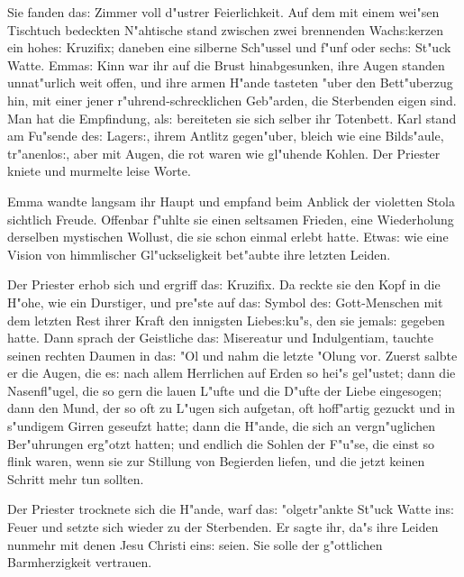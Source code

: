 \documentclass[oneside,12pt]{book}
\newenvironment{antiqua}{\normalfont}{}%
\newcommand{\s}{s:}%
\begin{document}
Sie fanden da{\s} Zimmer voll d"ustrer Feierlichkeit. Auf dem mit
einem wei"sen Tischtuch bedeckten N"ahtische stand zwischen zwei
brennenden Wach{\s}kerzen ein hohe{\s} Kruzifix; daneben eine
silberne Sch"ussel und f"unf oder sech{\s} St"uck Watte. Emma{\s}
Kinn war ihr auf die Brust hinabgesunken, ihre Augen standen
unnat"urlich weit offen, und ihre armen H"ande tasteten "uber den
Bett"uberzug hin, mit einer jener r"uhrend-schrecklichen
Geb"arden, die Sterbenden eigen sind. Man hat die Empfindung,
al{\s} bereiteten sie sich selber ihr Totenbett. Karl stand am
Fu"sende de{\s} Lager{\s}, ihrem Antlitz gegen"uber, bleich wie
eine Bilds"aule, tr"anenlo{\s}, aber mit Augen, die rot waren wie
gl"uhende Kohlen. Der Priester kniete und murmelte leise Worte.

Emma wandte langsam ihr Haupt und empfand beim Anblick der
violetten Stola sichtlich Freude. Offenbar f"uhlte sie einen
seltsamen Frieden, eine Wiederholung derselben mystischen Wollust,
die sie schon einmal erlebt hatte. Etwa{\s} wie eine Vision von
himmlischer Gl"uckseligkeit bet"aubte ihre letzten Leiden.

Der Priester erhob sich und ergriff da{\s} Kruzifix. Da reckte sie
den Kopf in die H"ohe, wie ein Durstiger, und pre"ste auf da{\s}
Symbol de{\s} Gott-Menschen mit dem letzten Rest ihrer Kraft den
innigsten Liebe{\s}ku"s, den sie jemal{\s} gegeben hatte. Dann
sprach der Geistliche da{\s}
\begin{antiqua}Misereatur\end{antiqua} und
\begin{antiqua}Indulgentiam\end{antiqua}, tauchte seinen rechten
Daumen in da{\s} "Ol und nahm die letzte "Olung vor. Zuerst salbte
er die Augen, die e{\s} nach allem Herrlichen auf Erden so hei"s
gel"ustet; dann die Nasenfl"ugel, die so gern die lauen L"ufte und
die D"ufte der Liebe eingesogen; dann den Mund, der so oft zu
L"ugen sich aufgetan, oft hoff"artig gezuckt und in s"undigem
Girren geseufzt hatte; dann die H"ande, die sich an vergn"uglichen
Ber"uhrungen erg"otzt hatten; und endlich die Sohlen der F"u"se,
die einst so flink waren, wenn sie zur Stillung von Begierden
liefen, und die jetzt keinen Schritt mehr tun sollten.

Der Priester trocknete sich die H"ande, warf da{\s} "olgetr"ankte
St"uck Watte in{\s} Feuer und setzte sich wieder zu der
Sterbenden. Er sagte ihr, da"s ihre Leiden nunmehr mit denen Jesu
Christi ein{\s} seien. Sie solle der g"ottlichen Barmherzigkeit
vertrauen.
\end{document}
